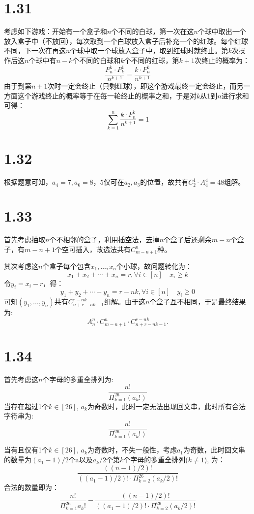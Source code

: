 \documentclass[UTF8,oneside]{article}
\begin{document}
\section{1.31}
考虑如下游戏：开始有一个盒子和$n$个不同的白球，第一次在这$n$个球中取出一个放入盒子中（不放回），每次取到一个白球放入盒子后补充一个的红球。每个红球不同，下一次在再这$n$个球中取一个球放入盒子中，取到红球时就终止。第$k$次操作后这$n$个球中有$n-k$个不同的白球和$k$个不同的红球，第$k+1$次终止的概率为：
\[
    \frac{P_n^{k}\cdot P_{k}^1}{n^{k+1}} = \frac{k\cdot P_n^k}{n^{k+1}}
\]
由于到第$n+1$次时一定会终止（只剩红球），即这个游戏最终一定会终止，而另一方面这个游戏终止的概率等于在每一轮终止的概率之和，于是对$k$从1到$n$进行求和可得：
\[
    \sum_{k=1}^n \frac{k\cdot P_n^k}{n^{k+1}} = 1
\]

\section{1.32}
根据题意可知，$a_4 = 7, a_6 = 8$，$5$仅可在$a_2,a_3$的位置，故共有$C^1_2\cdot A^4_4=48$组解。

\section{1.33}
首先考虑抽取$n$个不相邻的盒子，利用插空法，去掉$n$个盒子后还剩余$m-n$个盒子，有$m-n+1$个空可插入，故选法共有$C_{m-n+1}^n$种。

其次考虑这$n$个盒子每个包含$x_1,\dots,x_n$个小球，故问题转化为：
\[
    x_1 + x_2 +\cdots+x_n = r, \forall i\in [n] \quad x_i \ge k
\]
令$y_i = x_i -r$，得：
\[
    y_1 + y_2 +\cdots+y_n = r - nk, \forall i\in [n] \quad y_i \ge 0
\]
可知$(y_1,\dots,y_n)$共有$C^{r-nk}_{n+r-nk-1}$组解。由于这$n$个盒子互不相同，于是最终结果为:
\[
    A^n_n\cdot C_{m-n+1}^n\cdot C^{r-nk}_{n+r-nk-1}.
\]

\section{1.34}
首先考虑这$n$个字母的多重全排列为:
\[
    \frac{n!}{\Pi_{k=1}^{26}(a_k!)}
\]
当存在超过1个$k\in[26]$, $a_k$为奇数时，此时一定无法出现回文串，此时所有合法字符串为:
\[
    \frac{n!}{\Pi_{k=1}^{26}(a_k!)}
\]

当有且仅有1个$k\in[26]$, $a_{k}$为奇数时，不失一般性，考虑$a_1$为奇数，此时回文串的数量为$(a_1-1)/2$个a以及$a_k/2$个第$k$个字母的多重全排列($k\neq 1$), 为：
\[
    \frac{((n-1)/2)!}{((a_1-1)/2)!\cdot \Pi_{k=2}^{26}(a_k/2)!}
\]
合法的数量即为：
\[
    \frac{n!}{\Pi_{k=1}^{26}a_k!} - \frac{((n-1)/2)!}{((a_1-1)/2)!\cdot \Pi_{k=2}^{26}(a_k/2)!}
\]
\end{document}
